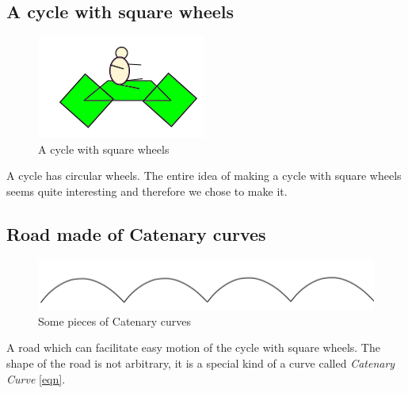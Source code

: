 \documentclass[12pt,a4paper]{article}
\begin{document}
\subsection{A cycle with square wheels} \label{sqr}
\begin{figure}
\includegraphics[width=0.75\linewidth]{cycle.png}
\caption {A cycle with square wheels}
\label{wrapfig}
\end{figure}
A cycle has circular wheels. The entire idea of making a cycle with square wheels seems quite interesting and therefore we chose to make it.
\\[10ex]
\subsection{Road made of Catenary curves} \label{road}
\begin{figure}
\includegraphics[width=0.8\linewidth]{road.png}
\caption{Some pieces of Catenary curves}
\end{figure}
A road which can facilitate easy motion of the cycle with square wheels. The shape of the road is not arbitrary, it is a special kind of a curve called \textit{Catenary Curve} \ref{eqn}.
\\[3ex]
\end{document}
